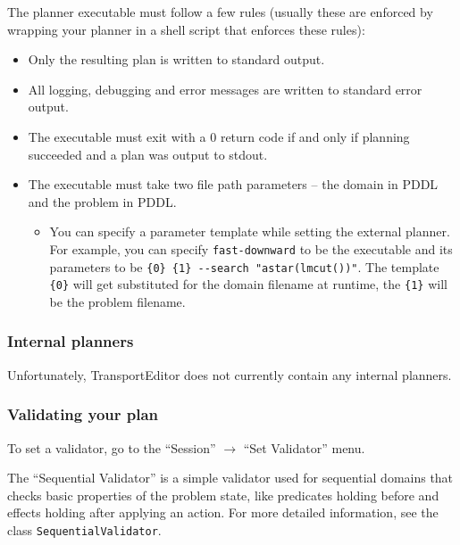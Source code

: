 The planner executable must follow a few rules (usually these are enforced by wrapping your planner in a shell script
that enforces these rules):

\begin{itemize}

\item Only the resulting plan is written to standard output.

\item All logging, debugging and error messages are written to standard error output.

\item The executable must exit with a 0 return code if and only if planning succeeded and a plan was output to stdout.

\item The executable must take two file path parameters -- the domain in PDDL and the problem in PDDL.

\begin{itemize}

\item You can specify a parameter template while setting the external planner. For example, you can specify \texttt{fast-downward}
to be the executable and its parameters to be \verb+{0} {1} --search "astar(lmcut())"+. The template \verb+{0}+ will get
substituted for the domain filename at runtime, the \verb+{1}+ will be the problem filename.

\end{itemize}

\end{itemize}

\subsubsection*{Internal planners}
Unfortunately, TransportEditor does not currently contain any internal planners.

\subsubsection*{Validating your plan}
To set a validator, go to the ``Session'' $\to$ ``Set Validator'' menu.

The ``Sequential Validator'' is a simple validator used for sequential domains that checks basic
properties of the problem state, like predicates holding before and effects holding after applying an action.
For more detailed information, see the class \texttt{SequentialValidator}.

